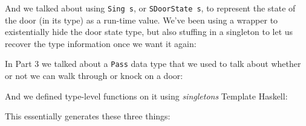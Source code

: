 \documentclass[]{article}
\newenvironment{Shaded}{}{}
\newcommand{\DataTypeTok}[1]{\textcolor[rgb]{0.56,0.13,0.00}{#1}}
\newcommand{\FunctionTok}[1]{\textcolor[rgb]{0.02,0.16,0.49}{#1}}
\newcommand{\KeywordTok}[1]{\textcolor[rgb]{0.00,0.44,0.13}{\textbf{#1}}}
\newcommand{\NormalTok}[1]{#1}
\newcommand{\OtherTok}[1]{\textcolor[rgb]{0.00,0.44,0.13}{#1}}
\begin{document}
And we talked about using \texttt{Sing\ s}, or \texttt{SDoorState\ s}, to
represent the state of the door (in its type) as a run-time value. We've been
using a wrapper to existentially hide the door state type, but also stuffing in
a singleton to let us recover the type information once we want it again:

\begin{Shaded}
\end{Shaded}

In Part 3 we talked about a \texttt{Pass} data type that we used to talk about
whether or not we can walk through or knock on a door:

\begin{Shaded}
\end{Shaded}

And we defined type-level functions on it using \emph{singletons} Template
Haskell:

\begin{Shaded}
\end{Shaded}

This essentially generates these three things:
\end{document}
